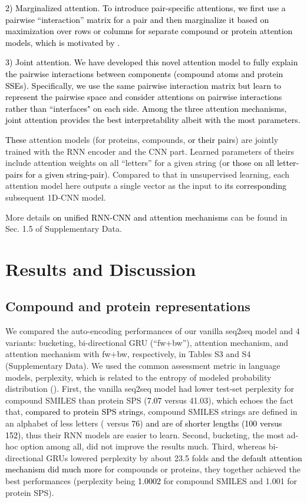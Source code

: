\documentclass[nocrop]{bioinfo}
\newcommand{\red}[1]{\textcolor{black}{#1}}
\begin{document}
\red{2) Marginalized attention. To introduce pair-specific attentions, we first use a pairwise ``interaction'' matrix for a pair and then marginalize it based on maximization over rows or columns for separate compound or protein attention models, which is motivated by \cite{lu2016hierarchical}.} 

\red{3) Joint attention. We have developed this novel attention model to fully explain the pairwise interactions between components (compound atoms and protein SSEs). Specifically, we use the same pairwise interaction matrix but learn to represent the pairwise space and consider attentions on pairwise interactions rather than ``interfaces" on each side. Among the three attention mechanisms, joint attention provides the best interpretability albeit with the most parameters.}

\red{These} attention models  (for proteins,  compounds, \red{or their pairs}) are jointly trained with the RNN encoder and the CNN part.  Learned parameters of theirs include attention weights on all ``letters'' for a given string \red{(or those on all letter-pairs for a given string-pair)}.  Compared to that in unsupervised learning, each attention model here outputs a single vector as the input to \red{its corresponding} subsequent 1D-CNN model.

More details \red{on unified RNN-CNN and attention mechanisms} can be found in Sec. 1.5 of Supplementary Data.



\vspace{-2em}
\section{Results and Discussion}
\subsection{Compound and protein representations}

We compared the auto-encoding performances of our vanilla seq2seq model and 4 variants: bucketing, bi-directional GRU  (``fw+bw''), attention mechanism, and attention mechanism with fw+bw, respectively, in Tables S3 and S4  (Supplementary Data).  We used the common assessment metric in language models, perplexity, which is related to the entropy  of modeled probability distribution   ().  First, the vanilla seq2seq model had lower test-set perplexity for compound SMILES than protein SPS  (\red{7.07} versus 41.03), which echoes the fact that, \red{compared to protein SPS strings}, compound SMILES strings are defined in an alphabet of less letters   ( versus \red{76}) \red{and are of shorter lengths  (100 versus 152)}, thus their RNN models are easier to learn.  Second, bucketing, the most ad-hoc option among all, did not improve the results much.  Third, whereas bi-directional GRUs lowered perplexity by about 23.5 folds \red{and the default attention mechanism did much more} for compounds or proteins, they together achieved the best performances  (perplexity being \red{1.0002} for compound SMILES and 1.001 for protein SPS). 
\end{document}
